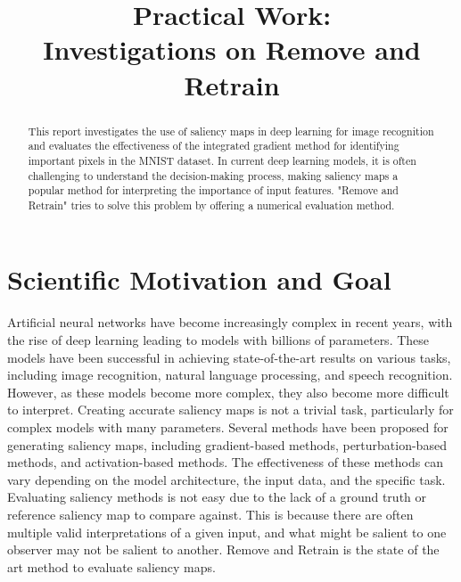 \documentclass[conference]{IEEEtran}
\begin{document}
\title{Practical Work: \\ Investigations on Remove and Retrain}

\author{
}


\maketitle

\begin{abstract}
This report investigates the use of saliency maps in deep learning for image recognition and evaluates the effectiveness of the integrated gradient method for identifying important pixels in the MNIST dataset. In current deep learning models, it is often challenging to understand the decision-making process, making saliency maps a popular method for interpreting the importance of input features. "Remove and Retrain" tries to solve this problem by offering a numerical evaluation method. 
\end{abstract}


\section{Scientific Motivation and Goal}
Artificial neural networks have become increasingly complex in recent years, with the rise of deep learning leading to models with billions of parameters. These models have been successful in achieving state-of-the-art results on various tasks, including image recognition, natural language processing, and speech recognition. However, as these models become more complex, they also become more difficult to interpret. Creating accurate saliency maps is not a trivial task, particularly for complex models with many parameters. Several methods have been proposed for generating saliency maps, including gradient-based methods, perturbation-based methods, and activation-based methods. The effectiveness of these methods can vary depending on the model architecture, the input data, and the specific task. Evaluating saliency methods is not easy due to the lack of a ground truth or reference saliency map to compare against. This is because there are often multiple valid interpretations of a given input, and what might be salient to one observer may not be salient to another. Remove and Retrain is the state of the art method to evaluate saliency maps.
\end{document}
